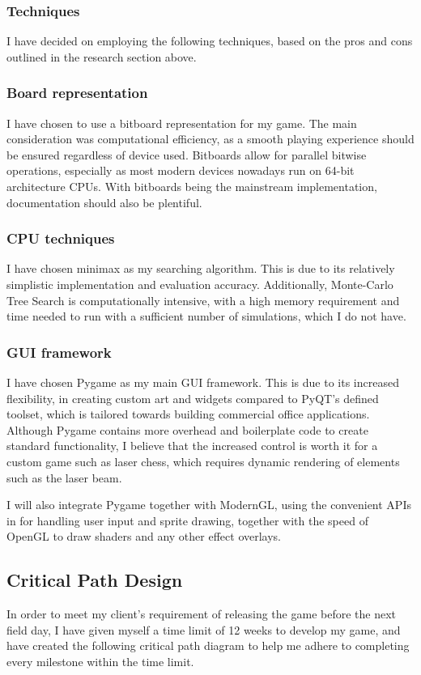 \documentclass[../main/main.tex]{subfiles}
\begin{document}
\subsubsection{Techniques}
I have decided on employing the following techniques, based on the pros and cons outlined in the research section above.

\subsubsection*{Board representation}
I have chosen to use a bitboard representation for my game. The main consideration was computational efficiency, as a smooth playing experience should be ensured regardless of device used. Bitboards allow for parallel bitwise operations, especially as most modern devices nowadays run on 64-bit architecture CPUs. With bitboards being the mainstream implementation, documentation should also be plentiful.

\subsubsection*{CPU techniques}
I have chosen minimax as my searching algorithm. This is due to its relatively simplistic implementation and evaluation accuracy. Additionally, Monte-Carlo Tree Search is computationally intensive, with a high memory requirement and time needed to run with a sufficient number of simulations, which I do not have. 

\subsubsection*{GUI framework}
I have chosen Pygame as my main GUI framework. This is due to its increased flexibility, in creating custom art and widgets compared to PyQT’s defined toolset, which is tailored towards building commercial office applications. Although Pygame contains more overhead and boilerplate code to create standard functionality, I believe that the increased control is worth it for a custom game such as laser chess, which requires dynamic rendering of elements such as the laser beam.

I will also integrate Pygame together with ModernGL, using the convenient APIs in for handling user input and sprite drawing, together with the speed of OpenGL to draw shaders and any other effect overlays.

\subsection{Critical Path Design}
In order to meet my client’s requirement of releasing the game before the next field day, I have given myself a time limit of 12 weeks to develop my game, and have created the following critical path diagram to help me adhere to completing every milestone within the time limit.
\end{document}
